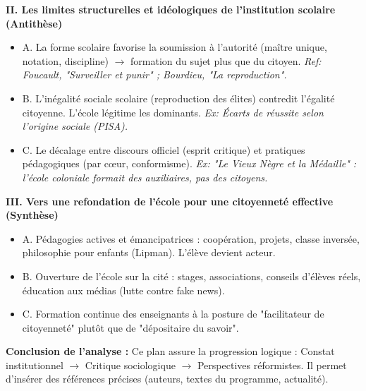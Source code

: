 \documentclass[11pt]{article}
\newcommand{\cle}[1]{{\popxbold\color{popdark}#1}}
\begin{document}
\begin{exoresolu}
    \textbf{II. Les limites structurelles et idéologiques de l'institution scolaire (Antithèse)}
    \begin{itemize}
        \item A. La forme scolaire favorise la soumission à l'autorité (maître unique, notation, discipline) $\rightarrow$ formation du \cle{sujet} plus que du citoyen. \textit{Ref: Foucault, "Surveiller et punir" ; Bourdieu, "La reproduction".}
        \item B. L'inégalité sociale scolaire (reproduction des élites) contredit l'égalité citoyenne. L'école légitime les dominants. \textit{Ex: Écarts de réussite selon l'origine sociale (PISA).}
        \item C. Le décalage entre discours officiel (esprit critique) et pratiques pédagogiques (par cœur, conformisme). \textit{Ex: "Le Vieux Nègre et la Médaille" : l'école coloniale formait des auxiliaires, pas des citoyens.}
    \end{itemize}
    
    \textbf{III. Vers une refondation de l'école pour une citoyenneté effective (Synthèse)}
    \begin{itemize}
        \item A. Pédagogies actives et émancipatrices : coopération, projets, classe inversée, philosophie pour enfants (Lipman). L'élève devient acteur.
        \item B. Ouverture de l'école sur la cité : stages, associations, conseils d'élèves réels, éducation aux médias (lutte contre fake news).
        \item C. Formation continue des enseignants à la posture de "facilitateur de citoyenneté" plutôt que de "dépositaire du savoir".
    \end{itemize}
    
    \textbf{Conclusion de l'analyse :} Ce plan assure la progression logique : Constat institutionnel $\rightarrow$ Critique sociologique $\rightarrow$ Perspectives réformistes. Il permet d'insérer des références précises (auteurs, textes du programme, actualité).
\end{exoresolu}
\end{document}
